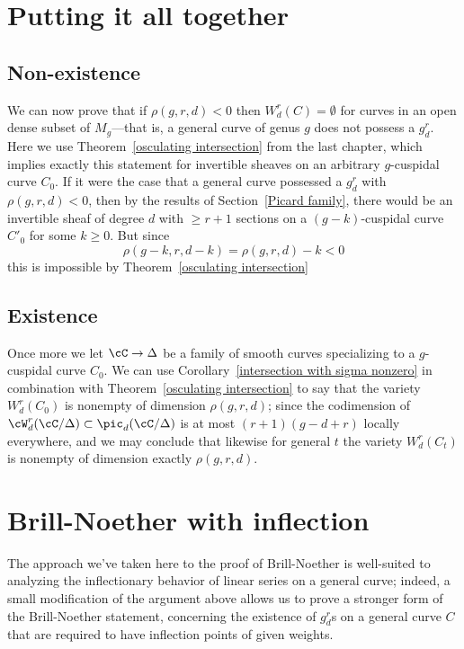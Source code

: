 \section{Putting it all together}

\subsection{Non-existence}\label{nonexistence}

We can now prove that if $\rho(g,r,d) < 0$  then $W^{r}_{d}(C) = \emptyset$ for curves in an open dense subset of $M_{g}$---that is, a general curve of genus $g$ does not possess a $g^r_d$.
Here we use Theorem~\ref{osculating intersection} from the last chapter, which implies exactly this statement for invertible sheaves on an arbitrary $g$-cuspidal curve $C_0$. If it were the case that a general curve possessed a $g^r_d$ with $\rho(g,r,d) < 0$, then by the results of Section~\ref{Picard family}, there would be
 an invertible sheaf of degree $d$ with $\geq r+1$ sections on a $(g-k)$-cuspidal curve  $ C'_0$ for some $k \geq 0$. But since
$$
\rho(g-k, r, d-k) = \rho(g,r,d) - k < 0
$$
this is impossible by Theorem~\ref{osculating intersection}

\subsection{Existence}

Once more we let $\cC \to \Delta$ be a family of smooth curves specializing to a $g$-cuspidal curve $C_0$. We can use Corollary~\ref{intersection with sigma nonzero} in combination with Theorem~\ref{osculating intersection} to say that the variety $W^r_d(C_0)$ is nonempty of dimension $\rho(g,r,d)$; since the codimension of $\cW^r_d(\cC/\Delta) \subset \pic_d(\cC/\Delta)$ is at most $(r+1)(g-d+r)$ locally everywhere, and we may conclude that likewise for general $t$ the variety $W^r_d(C_t)$ is nonempty of dimension exactly $\rho(g,r,d)$. 

\section{Brill-Noether with inflection}

The approach we've taken here to the proof of Brill-Noether is well-suited to analyzing the inflectionary behavior of linear series on a general curve; indeed, a small modification of the argument above allows us to prove a stronger form of the Brill-Noether statement, concerning the existence of $g^r_d$s on a general curve $C$ that are required to
 have inflection points of given weights.

